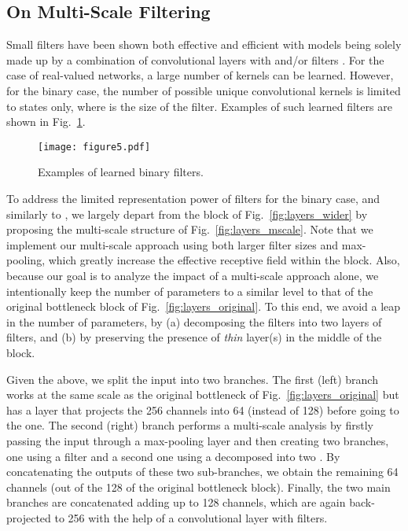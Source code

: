 \documentclass[10pt,journal,compsoc]{IEEEtran}
\begin{document}
\subsection{On Multi-Scale Filtering} \label{ssec:size_filters}
Small filters have been shown both effective and efficient \cite{simonyan2014very,szegedy2015going} with models being solely made up by a combination of convolutional layers with  and/or  filters \cite{he2016deep,he2016identity,simonyan2014very}. For the case of real-valued networks, a large number of kernels can be learned. However, for the binary case, the number of possible unique convolutional kernels is limited to  states only, where  is the size of the filter.
Examples of such  learned filters are shown in Fig.~\ref{fig:ifilters_3x3}.

\begin{figure}[!htb]
    \centering
    \texttt{[image: figure5.pdf]}
    \caption{Examples of learned  binary filters.}
    \label{fig:ifilters_3x3}
\end{figure}

To address the limited representation power of  filters for the binary case, and similarly to \cite{szegedy2017inception}, we largely depart from the block of Fig.~\ref{fig:layers_wider} by proposing the multi-scale structure of Fig.~\ref{fig:layers_mscale}. Note that we implement our multi-scale approach using both larger filter sizes and max-pooling, which greatly increase the effective receptive field within the block. Also, because our goal is to analyze the impact of a multi-scale approach alone, we intentionally keep the number of parameters to a similar level to that of the original bottleneck block of  Fig.~\ref{fig:layers_original}. To this end, we avoid a leap in the number of parameters, by (a) decomposing the  filters into two layers of   filters, and (b) by preserving the presence of \textit{thin} layer(s) in the middle of the block.

Given the above, we split the input into two branches. The first (left) branch works at the same scale as the original bottleneck of Fig.~\ref{fig:layers_original} but has a  layer that projects the 256 channels into 64 (instead of 128) before going to the  one. The second (right) branch performs a multi-scale analysis by firstly passing the input through a max-pooling layer and then creating two branches, one using a  filter and a second one using a  decomposed into two . By concatenating the outputs of these two sub-branches, we obtain the remaining 64 channels (out of the 128 of the original bottleneck block). Finally, the two main branches are concatenated adding up to 128 channels, which are again back-projected to 256 with the help of a convolutional layer with  filters.
\end{document}
